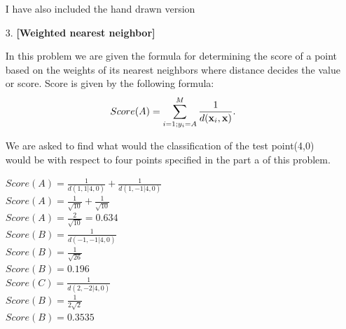 \documentclass[11pt]{article}
\begin{document}
\begin{enumerate}
I have also included the hand drawn version

\begin{figure}[H]%
	\centering
	
\end{figure}

\item[3.] \textbf{[Weighted nearest neighbor]}	

In this problem we are given the formula for determining the score of a point based on the weights of its nearest neighbors where distance decides the value or score. Score is given by the following  formula: \\

$$Score(A) = \sum_{i=1; y_i = A}^M \frac{1}{d({\bf x}_i, {\bf x})}.$$

We are asked to find what would the classification of the test point(4,0) would be with respect to four points specified in the part a of this problem.

$Score(A) =\frac{1}{d(1,1 | 4,0)} + \frac{1}{d(1,-1 | 4,0)}$\\
$Score(A) = \frac{1}{\sqrt{10}} + \frac{1}{\sqrt{10}} $\\
$\boxed{Score(A) = \frac{2}{\sqrt{10}} = 0.634}$\\

$Score(B) =\frac{1}{d(-1,-1 | 4,0)} $\\
$Score(B) =\frac{1}{\sqrt{26}} $\\
$\boxed{Score(B) =0.196}$\\

$Score(C) =\frac{1}{d(2,-2 | 4,0)} $\\
$Score(B) =\frac{1}{2\sqrt{2}} $\\
$\boxed{Score(B) =0.3535}$\\


\end{enumerate}
\end{document}
